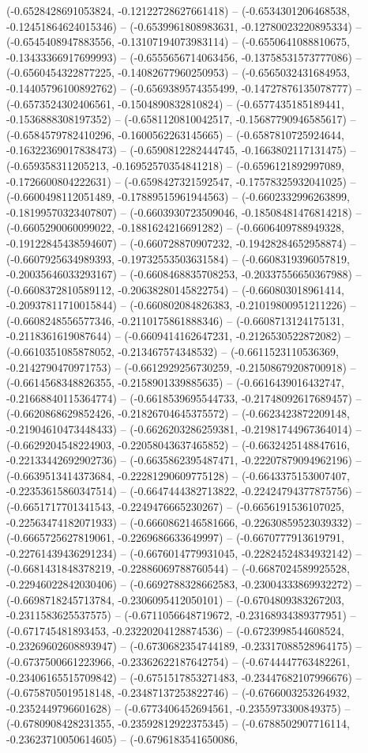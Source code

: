 (-0.6528428691053824, -0.12122728627661418) -- (-0.6534301206468538, -0.12451864624015346) -- (-0.6539961808983631, -0.12780023220895334) -- (-0.6545408947883556, -0.13107194073983114) -- (-0.6550641088810675, -0.13433366917699993) -- (-0.6555656714063456, -0.13758531573777086) -- (-0.6560454322877225, -0.14082677960250953) -- (-0.6565032431684953, -0.14405796100892762) -- (-0.6569389574355499, -0.14727876135078777) -- (-0.6573524302406561, -0.1504890832810824) -- (-0.6577435185189441, -0.1536888308197352) -- (-0.6581120810042517, -0.15687790946585617) -- (-0.6584579782410296, -0.1600562263145665) -- (-0.6587810725924644, -0.16322369017838473) -- (-0.6590812282444745, -0.1663802117131475) -- (-0.659358311205213, -0.16952570354841218) -- (-0.6596121892997089, -0.1726600804222631) -- (-0.6598427321592547, -0.17578325932041025) -- (-0.6600498112051489, -0.17889515961944563) -- (-0.6602332996263899, -0.18199570323407807) -- (-0.6603930723509046, -0.18508481476814218) -- (-0.6605290060099022, -0.1881624216691282) -- (-0.6606409788949328, -0.19122845438594607) -- (-0.660728870907232, -0.19428284652958874) -- (-0.6607925634989393, -0.19732553503631584) -- (-0.6608319396057819, -0.20035646033293167) -- (-0.6608468835708253, -0.20337556650367988) -- (-0.6608372810589112, -0.20638280145822754) -- (-0.660803018961414, -0.20937811710015844) -- (-0.660802084826383, -0.21019800951211226) -- (-0.6608248556577346, -0.2110175861888346) -- (-0.6608713124175131, -0.2118361619087644) -- (-0.6609414162647231, -0.2126530522872082) -- (-0.6610351085878052, -0.213467574348532) -- (-0.6611523110536369, -0.2142790470971753) -- (-0.6612929256730259, -0.21508679208700918) -- (-0.6614568348826355, -0.2158901339885635) -- (-0.6616439016432747, -0.21668840115364774) -- (-0.6618539695544733, -0.21748092617689457) -- (-0.6620868629852426, -0.21826704645375572) -- (-0.6623423872209148, -0.21904610473448433) -- (-0.6626203286259381, -0.21981744967364014) -- (-0.6629204548224903, -0.22058043637465852) -- (-0.6632425148847616, -0.22133442692902736) -- (-0.6635862395487471, -0.22207879094962196) -- (-0.6639513414373684, -0.22281290609775128) -- (-0.6643375153007407, -0.22353615860347514) -- (-0.6647444382713822, -0.22424794377875756) -- (-0.6651717701341543, -0.2249476665230267) -- (-0.6656191536107025, -0.22563474182071933) -- (-0.6660862146581666, -0.22630859523039332) -- (-0.6665725627819061, -0.2269686633649997) -- (-0.6670777913619791, -0.22761439436291234) -- (-0.6676014779931045, -0.22824524834932142) -- (-0.6681431848378219, -0.22886069788760544) -- (-0.6687024589925528, -0.22946022842030406) -- (-0.6692788328662583, -0.23004333869932272) -- (-0.6698718245713784, -0.2306095412050101) -- (-0.6704809383267203, -0.2311583625537575) -- (-0.6711056648719672, -0.23168934389377951) -- (-0.671745481893453, -0.23220204128874536) -- (-0.6723998544608524, -0.23269602608893947) -- (-0.6730682354744189, -0.23317088528964175) -- (-0.6737500661223966, -0.23362622187642754) -- (-0.6744447763482261, -0.23406165515709842) -- (-0.6751517853271483, -0.23447682107996676) -- (-0.6758705019518148, -0.23487137253822746) -- (-0.6766003253264932, -0.2352449796601628) -- (-0.6773406452694561, -0.2355973300849375) -- (-0.6780908428231355, -0.23592812922375345) -- (-0.6788502907716114, -0.23623710050614605) -- (-0.6796183541650086, 